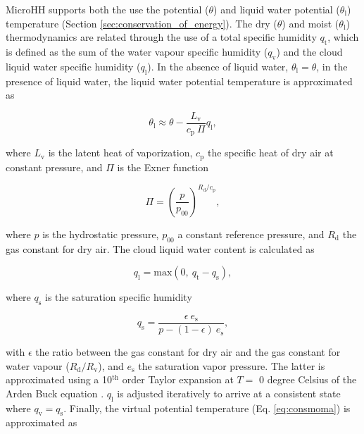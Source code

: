 \documentclass[gmd]{copernicus}
\begin{document}
MicroHH supports both the use the potential  ($\theta$) and liquid water potential ($\theta_\mathrm{l}$) temperature (Section \ref{sec:conservation_of_energy}). The dry ($\theta$) and moist ($\theta_\mathrm{l}$) thermodynamics are related through the use of a total specific humidity $q_\mathrm{t}$, which is defined as the sum of the water vapour specific humidity ($q_\mathrm{v}$) and the cloud liquid water specific humidity ($q_\mathrm{l}$). In the absence of liquid water, $\theta_\mathrm{l} = \theta$, in the presence of liquid water, the liquid water potential temperature is approximated as \citep{Betts1973}

\begin{equation}
\theta_\mathrm{l} \approx \theta - \frac{L_\mathrm{v}}{c_\mathrm{p} ~ \Pi} q_\mathrm{l}, 	
\end{equation}

\noindent where $L_\mathrm{v}$ is the latent heat of vaporization, $c_\mathrm{p}$ the specific heat of dry air at constant pressure, and $\Pi$ is the Exner function

\begin{equation}
	\Pi = \left( \frac{p}{p_{00}} \right)^{R_\mathrm{d} / c_\mathrm{p}},
\end{equation}

\noindent where $p$ is the hydrostatic pressure, $p_\mathrm{00}$ a constant reference pressure, and $R_\mathrm{d}$ the gas constant for dry air. The cloud liquid water content is calculated as

\begin{equation}
	q_\mathrm{l} = \mathrm{max}(0, ~q_\mathrm{t} - q_\mathrm{s}),
\end{equation}

\noindent where $q_\mathrm{s}$ is the saturation specific humidity

\begin{equation}
	q_\mathrm{s} = \frac{\epsilon ~ e_\mathrm{s}}{p - (1-\epsilon) ~ e_\mathrm{s}},
\end{equation}

\noindent with $\epsilon$ the ratio between the gas constant for dry air and the gas constant for water vapour ($R_\mathrm{d}/R_\mathrm{v}$), and $e_\mathrm{s}$ the saturation vapor pressure. The latter is approximated using a 10$^\mathrm{th}$ order Taylor expansion at $T=$ 0 degree Celsius of the Arden Buck equation \citep{Buck1981}. $q_\mathrm{l}$ is adjusted iteratively to arrive at a consistent state where $q_\mathrm{v} = q_\mathrm{s}$. Finally, the virtual potential temperature (Eq. \ref{eq:consmoma}) is approximated as 
\end{document}
